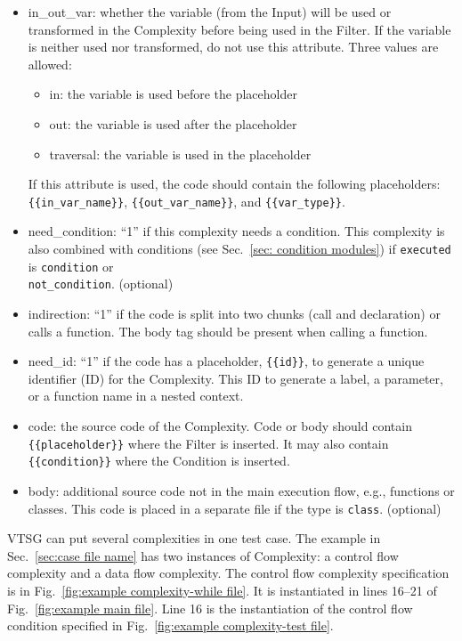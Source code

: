 \begin{itemize}
    \item in\_out\_var: whether the variable (from the Input) will be used or
    transformed in the Complexity before being used in the Filter.  If the
    variable is neither used nor transformed, do not use this attribute.
    Three values are allowed:
    \begin{itemize}[nosep]
        \item in: the variable is used before the placeholder
        \item out: the variable is used after the placeholder
        \item traversal: the variable is used in the placeholder
    \end{itemize}
    If this attribute is used, the code should contain the following
    placeholders: \\
    \verb|{{in_var_name}}|, \verb|{{out_var_name}}|, and \verb|{{var_type}}|.

    \item need\_condition: ``1'' if this complexity needs a condition.
      This complexity is also combined with conditions (see
      Sec.~\ref{sec: condition modules}) if \verb|executed| is \verb|condition|
      or \\ \verb|not_condition|. (optional)

    \item indirection: ``1'' if the code is split into two chunks (call and
    declaration) or calls a function.  The body tag should be present when
    calling a function.

    \item need\_id: ``1'' if the code has a placeholder, \verb|{{id}}|,
    to generate a unique identifier (ID) for the Complexity.  This ID to generate
    a label, a parameter, or a function name in a nested
    context.

    \item code: the source code of the Complexity.  Code or
    body should contain \\ \verb|{{placeholder}}|
    where the Filter is inserted.  It may also contain
    \verb|{{condition}}| where the Condition
    is inserted.

    \item body: additional source code not in the main execution flow,
    e.g., functions or classes.  This code is placed in a separate file
    if the type is \verb|class|. (optional)
\end{itemize}

VTSG can put several complexities in one test case.
The example in Sec.~\ref{sec:case file name} has two instances of
Complexity: a control flow complexity and a data flow complexity.
The control flow complexity specification is in
Fig.~\ref{fig:example complexity-while file}.  It is instantiated in
lines 16--21 of
Fig.~\ref{fig:example main file}.  Line 16 is the instantiation of
the control flow condition
specified in Fig.~\ref{fig:example complexity-test file}.

